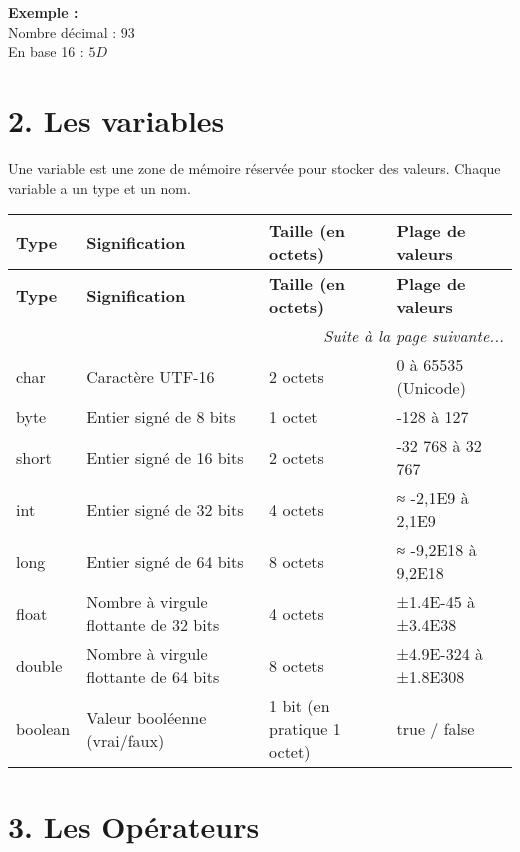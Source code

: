 \documentclass{article}
\begin{document}
\textbf{Exemple :} \\
Nombre décimal : \( 93 \) \\
En base 16 : \( 5D \)

\section*{2. Les variables}
Une variable est une zone de mémoire réservée pour stocker des valeurs. Chaque variable a un type et un nom.


\begin{longtable}{|l|l|l|l|}
\hline
\textbf{Type} & \textbf{Signification} & \textbf{Taille (en octets)} & \textbf{Plage de valeurs} \\
\hline
\endfirsthead

\hline
\textbf{Type} & \textbf{Signification} & \textbf{Taille (en octets)} & \textbf{Plage de valeurs} \\
\hline
\endhead

\hline
\multicolumn{4}{|r|}{\textit{Suite à la page suivante...}} \\
\hline
\endfoot

\hline
\endlastfoot

char & Caractère UTF-16 & 2 octets & 0 à 65535 (Unicode) \\
\hline
byte & Entier signé de 8 bits & 1 octet & -128 à 127 \\
\hline
short & Entier signé de 16 bits & 2 octets & -32 768 à 32 767 \\
\hline
int & Entier signé de 32 bits & 4 octets & ≈ -2,1E9 à 2,1E9 \\
\hline
long & Entier signé de 64 bits & 8 octets & ≈ -9,2E18 à 9,2E18 \\
\hline
float & Nombre à virgule flottante de 32 bits & 4 octets & ±1.4E-45 à ±3.4E38 \\
\hline
double & Nombre à virgule flottante de 64 bits & 8 octets & ±4.9E-324 à ±1.8E308 \\
\hline
boolean & Valeur booléenne (vrai/faux) & 1 bit (en pratique 1 octet) & true / false \\
\hline

\end{longtable}



\section*{3. Les Opérateurs}
\end{document}
